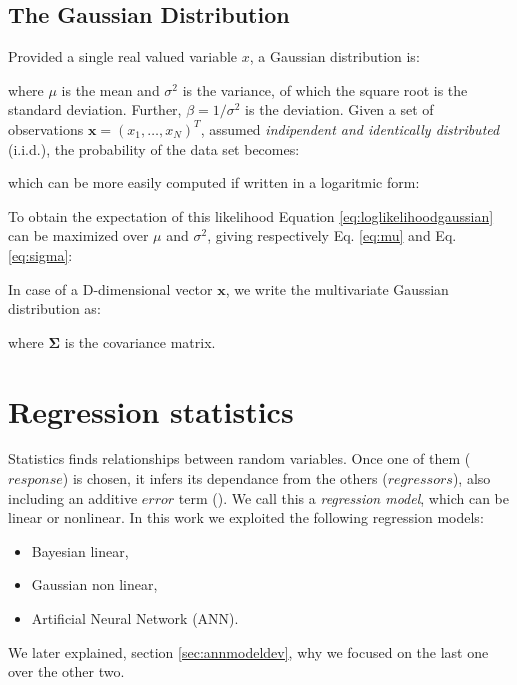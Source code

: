\subsection{The Gaussian Distribution}
\label{subsec:gaussian}

Provided a single real valued variable $x$, a Gaussian distribution is:

where $\mu$ is the mean and $\sigma^2$ is the variance, of which the square root
is the standard deviation.
Further, $\beta = 1/\sigma^2$ is the deviation.
Given a set of observations $\mathbf{x} = (x_1, \ldots, x_N)^T$, assumed
\textit{indipendent and identically distributed} (i.i.d.), the probability of
the data set becomes:

which can be more easily computed if written in a logaritmic form:

To obtain the expectation of this likelihood Equation
\ref{eq:loglikelihoodgaussian} can be maximized over $\mu$ and $\sigma^2$,
giving respectively Eq. \ref{eq:mu} and Eq. \ref{eq:sigma}:


In case of a D-dimensional vector $\mathbf{x}$, we write the multivariate
Gaussian distribution as:

where $\mathbf{\Sigma}$ is the covariance matrix.


\section{Regression statistics}
\label{sec:regressionstatistics}

Statistics finds relationships between random variables.
Once one of them ($response$) is chosen, it infers its dependance from the
others ($regressors$), also including an additive $error$ term
(\citet{RefWorks:194}). We call this a \textit{regression model}, which can be
linear or nonlinear.
In this work we exploited the following regression models:
\begin{itemize}
  \item{Bayesian linear,}
  \item{Gaussian non linear,}
  \item{Artificial Neural Network (\acs{ANN}).}
\end{itemize}
We later explained, section \ref{sec:annmodeldev}, why we focused on the last
one over the other two.

